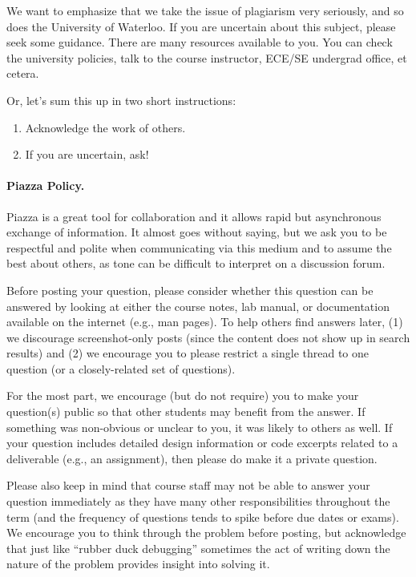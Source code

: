 We want to emphasize that we take the issue of plagiarism very seriously, and so does the University of Waterloo. If you are uncertain about this subject, please seek some guidance. There are many resources available to you. You can check the university policies, talk to the course instructor, ECE/SE undergrad office, et cetera.

Or, let's sum this up in two short instructions:
\begin{enumerate}
	\item Acknowledge the work of others. 
	\item If you are uncertain, ask!
\end{enumerate}

\paragraph{Piazza Policy.}
Piazza is a great tool for collaboration and it allows rapid but asynchronous exchange of information. It almost goes without saying, but we ask you to be respectful and polite when communicating via this medium and to assume the best about others, as tone can be difficult to interpret on a discussion forum. 

Before posting your question, please consider whether this question can be answered by looking at either the course notes, lab manual, or documentation available on the internet (e.g., man pages). To help others find answers later, (1) we discourage screenshot-only posts (since the content does not show up in search results) and (2) we encourage you to please restrict a single thread to one question (or a closely-related set of questions).

For the most part, we encourage (but do not require) you to make your question(s) public so that other students may benefit from the answer. If something was non-obvious or unclear to you, it was likely to others as well. If your question includes detailed design information or code excerpts related to a deliverable (e.g., an assignment), then please do make it a private question.

Please also keep in mind that course staff may not be able to answer your question immediately as they have many other responsibilities throughout the term (and the frequency of questions tends to spike before due dates or exams). We encourage you to think through the problem before posting, but acknowledge that just like ``rubber duck debugging'' sometimes the act of writing down the nature of the problem provides insight into solving it.

